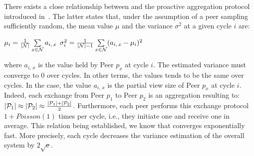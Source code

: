 There exists a close relationship between \SCAMPLON{} and the proactive
aggregation protocol introduced
in~\cite{jelasity2004epidemic,montresor2004robust}. The latter states that,
under the assumption of a peer sampling sufficiently random, the mean value
$\mu$ and the variance $\sigma^2$ at a given cycle $i$ are:
\begin{center}
  $\mu_i = {1\over{|\mathcal{N}|}} \sum\limits_{x \in \mathcal{N}} a_{i,\,x}$
  \hfill
  $\sigma^2_i = {1\over{|\mathcal{N}|-1}}\sum\limits_{x \in \mathcal{N}}
  (a_{i,\,x} - \mu_i)^2$
\end{center}
where $a_{i,\,x}$ is the value held by Peer $p_x$ at cycle $i$. The estimated
variance must converge to $0$ over cycles. In other terms, the values tends to
be the same over cycles. In the \SCAMPLON{} case, the value $a_{i,\,x}$ is the
partial view size of Peer $p_x$ at cycle $i$. Indeed, each exchange from Peer
$p_1$ to Peer $p_2$ is an aggregation resulting to:
$|\mathcal{P}_1|\approx|\mathcal{P}_2|\approx{|\mathcal{P}_1| + |\mathcal{P}_2|
  \over{2}}$.
Furthermore, each peer performs this exchange protocol $1+Poisson(1)$ times per
cycle, i.e., they initiate one and receive one in average.  This relation being
established, we know that \SCAMPLON{} converges exponentially fast. More
precisely, each cycle decreases the variance estimation of the overall system
by ${2\sqrt{\text{e}}}$.

